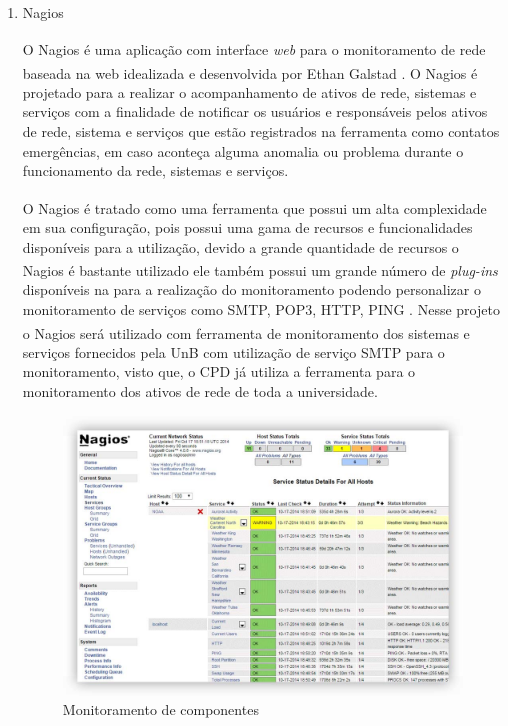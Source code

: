 \begin{enumerate}
\item Nagios\textsuperscript{\textregistered}

O Nagios\textsuperscript{\textregistered} é uma aplicação com interface \textit{web} para o monitoramento de rede baseada na web idealizada e desenvolvida por Ethan Galstad \cite{bin2011new}. O Nagios\textsuperscript{\textregistered} é projetado para a realizar o acompanhamento de ativos de rede, sistemas e serviços com a finalidade de notificar os usuários e responsáveis pelos ativos de rede, sistema e serviços que estão registrados na ferramenta como contatos emergências, em caso aconteça alguma anomalia ou problema durante o funcionamento da rede, sistemas e serviços.

O Nagios\textsuperscript{\textregistered} é tratado como uma ferramenta que possui um alta complexidade em sua configuração, pois possui uma gama de recursos e funcionalidades disponíveis para a utilização, devido a grande quantidade de recursos o Nagios\textsuperscript{\textregistered} é bastante utilizado ele também possui um grande número de \textit{plug-ins} disponíveis na para a realização do monitoramento podendo personalizar o monitoramento de serviços como SMTP, POP3, HTTP, PING \cite{lcc2012nagios}. Nesse projeto o Nagios\textsuperscript{\textregistered} será utilizado com ferramenta de monitoramento dos sistemas e serviços fornecidos pela \acrshort{UnB} com utilização de serviço SMTP para o monitoramento, visto que, o \acrshort{CPD} já utiliza a ferramenta para o monitoramento dos ativos de rede de toda a universidade. 

\begin{figure}[h!]
	\begin{center}
	\includegraphics[scale = 0.39]{img/Comprehensive_Monitoring_Drop2.jpg}
		\caption{Monitoramento de componentes\cite{lcc2012nagios}}
		\label{fun:fig:nagios}
	\end{center}
\end{figure}


\end{enumerate}
